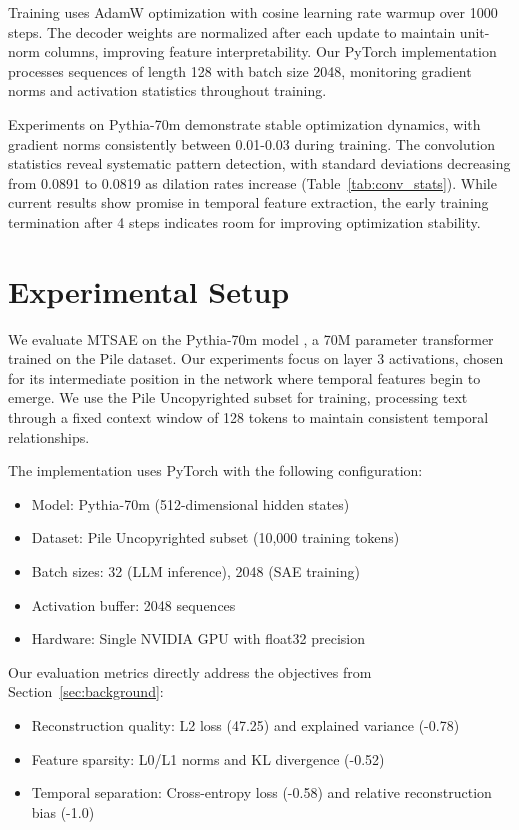 \documentclass{article} %
\begin{document}
Training uses AdamW optimization with cosine learning rate warmup over 1000 steps. The decoder weights are normalized after each update to maintain unit-norm columns, improving feature interpretability. Our PyTorch implementation processes sequences of length 128 with batch size 2048, monitoring gradient norms and activation statistics throughout training.

Experiments on Pythia-70m demonstrate stable optimization dynamics, with gradient norms consistently between 0.01-0.03 during training. The convolution statistics reveal systematic pattern detection, with standard deviations decreasing from 0.0891 to 0.0819 as dilation rates increase (Table~\ref{tab:conv_stats}). While current results show promise in temporal feature extraction, the early training termination after 4 steps indicates room for improving optimization stability.

\section{Experimental Setup}
\label{sec:experimental}

We evaluate MTSAE on the Pythia-70m model \cite{radford2019language}, a 70M parameter transformer trained on the Pile dataset. Our experiments focus on layer 3 activations, chosen for its intermediate position in the network where temporal features begin to emerge. We use the Pile Uncopyrighted subset for training, processing text through a fixed context window of 128 tokens to maintain consistent temporal relationships.

The implementation uses PyTorch \cite{paszke2019pytorch} with the following configuration:
\begin{itemize}
    \item Model: Pythia-70m (512-dimensional hidden states)
    \item Dataset: Pile Uncopyrighted subset (10,000 training tokens)
    \item Batch sizes: 32 (LLM inference), 2048 (SAE training)
    \item Activation buffer: 2048 sequences
    \item Hardware: Single NVIDIA GPU with float32 precision
\end{itemize}

Our evaluation metrics directly address the objectives from Section~\ref{sec:background}:
\begin{itemize}
    \item Reconstruction quality: L2 loss (47.25) and explained variance (-0.78)
    \item Feature sparsity: L0/L1 norms and KL divergence (-0.52)
    \item Temporal separation: Cross-entropy loss (-0.58) and relative reconstruction bias (-1.0)
\end{itemize}
\end{document}
